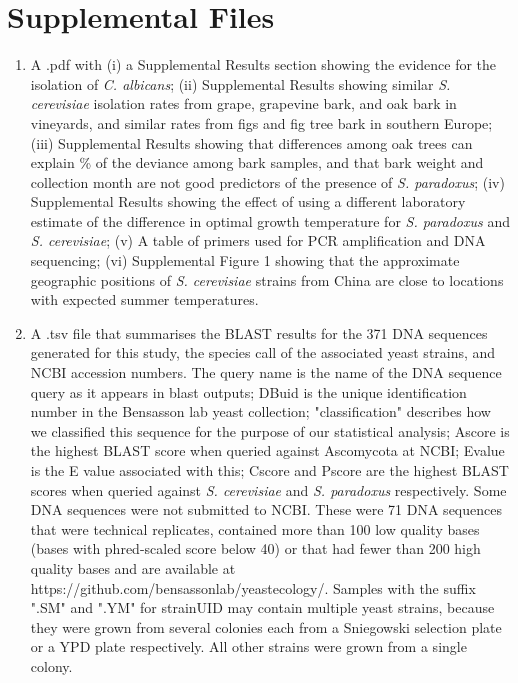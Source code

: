 \documentclass[12pt]{article}
\begin{document}
\section*{Supplemental Files}
\label{sec:Supplemental Files}
\begin{enumerate}

\item \label{itm:suppTablesFigs.pdf} A .pdf with (i) a Supplemental Results section showing the evidence for the isolation of \textit{C. albicans}; (ii) Supplemental Results showing similar \textit{S. cerevisiae} isolation rates from grape, grapevine bark, and oak bark in vineyards, and similar rates from figs and fig tree bark in southern Europe; (iii) Supplemental Results showing that differences among oak trees can explain \treepcentdev\% of the deviance among bark samples, and that bark weight and collection month are not good predictors of the presence of \textit{S. paradoxus}; (iv) Supplemental Results showing the effect of using a different laboratory estimate of the difference in optimal growth temperature for \textit{S. paradoxus} and \textit{S. cerevisiae}; (v) A table of primers used for PCR amplification and DNA sequencing; (vi) Supplemental Figure 1 showing that the approximate geographic positions of \textit{S. cerevisiae} strains from China are close to locations with expected summer temperatures.

\item \label{itm:suppTable1.tsv} A .tsv file that summarises the BLAST results for the 371 DNA sequences generated for this study, the species call of the associated yeast strains, and NCBI accession numbers. The query name is the name of the DNA sequence query as it appears in blast outputs; DBuid is the unique identification number in the Bensasson lab yeast collection; "classification" describes how we classified this sequence for the purpose of our statistical analysis; Ascore is the highest BLAST score when queried against Ascomycota at NCBI; Evalue is the E value associated with this; Cscore and Pscore are the highest BLAST scores when queried against \textit{S. cerevisiae} and \textit{S. paradoxus} respectively. Some DNA sequences were not submitted to NCBI. These were 71 DNA sequences that were technical replicates, contained more than 100 low quality bases (bases with phred-scaled score below 40) or that had fewer than 200 high quality bases and are available at https://github.com/bensassonlab/yeastecology/. Samples with the suffix ".SM" and ".YM" for strainUID may contain multiple yeast strains, because they were grown from several colonies each from a Sniegowski selection plate or a YPD plate respectively. All other strains were grown from a single colony.


\end{enumerate}
\end{document}
